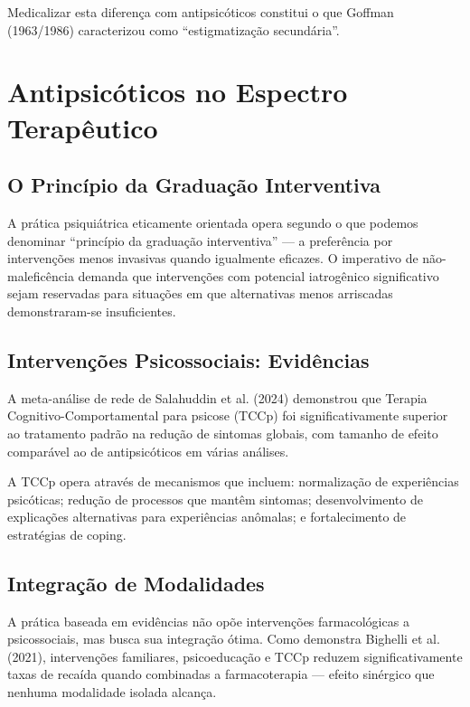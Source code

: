 Medicalizar esta diferença com antipsicóticos constitui o que Goffman (1963/1986) caracterizou como \enquote{estigmatização secundária}.

\section{Antipsicóticos no Espectro Terapêutico}
\label{sec:espectro-terapeutico}

\subsection{O Princípio da Graduação Interventiva}

A prática psiquiátrica eticamente orientada opera segundo o que podemos denominar \enquote{princípio da graduação interventiva} --- a preferência por intervenções menos invasivas quando igualmente eficazes. O imperativo de não-maleficência demanda que intervenções com potencial iatrogênico significativo sejam reservadas para situações em que alternativas menos arriscadas demonstraram-se insuficientes.

\subsection{Intervenções Psicossociais: Evidências}

A meta-análise de rede de Salahuddin et al. (2024) demonstrou que Terapia Cognitivo-Comportamental para psicose (TCCp) foi significativamente superior ao tratamento padrão na redução de sintomas globais, com tamanho de efeito comparável ao de antipsicóticos em várias análises.

A TCCp opera através de mecanismos que incluem: normalização de experiências psicóticas; redução de processos que mantêm sintomas; desenvolvimento de explicações alternativas para experiências anômalas; e fortalecimento de estratégias de coping.

\subsection{Integração de Modalidades}

A prática baseada em evidências não opõe intervenções farmacológicas a psicossociais, mas busca sua integração ótima. Como demonstra Bighelli et al. (2021), intervenções familiares, psicoeducação e TCCp reduzem significativamente taxas de recaída quando combinadas a farmacoterapia --- efeito sinérgico que nenhuma modalidade isolada alcança.

